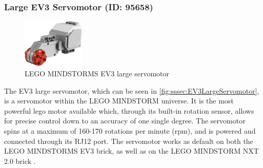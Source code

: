 \subsubsection{Large EV3 Servomotor (ID: 95658)}
\begin{figure}[H]
  \centering
  \includegraphics[width=3cm]{images/techAnalysis/LegoEV3LargeServomotor.jpg}
  \caption{LEGO MINDSTORMS EV3 large servomotor \cite{BrickOWl-figure-EV3-largeServo}}\label{fig:sssec:EV3LargeServomotor}
\end{figure}
The EV3 large servomotor, which can be seen in \autoref{fig:sssec:EV3LargeServomotor}, is a servomotor within the LEGO MINDSTORM universe.
It is the most powerful lego motor available which, through its built-in rotation sensor, allows for precise control down to an accuracy of one single degree.
The servomotor spins at a maximum of 160-170 rotations per minute (rpm), and is powered and connected through its RJ12 port.
The servomotor works as default on both the LEGO MINDSTORMS EV3 brick, as well as on the LEGO MINDSTORM NXT 2.0 brick \cite{lego_lego_EV3NXTCompatibility}.
\cite{LEGO_mindstorms_2013-1}
